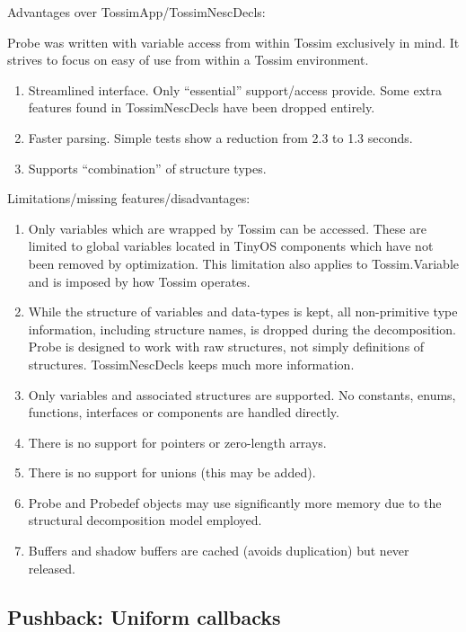 Advantages over TossimApp/TossimNescDecls:

Probe was written with variable access from within Tossim exclusively
in mind. It strives to focus on easy of use from within a Tossim
environment.
\begin{enumerate}
\item Streamlined interface. Only ``essential'' support/access
  provide. Some extra features found in TossimNescDecls have been
  dropped entirely.
\item Faster parsing. Simple tests show a reduction from 2.3 to 1.3
  seconds.
\item Supports ``combination'' of structure types.
\end{enumerate}

Limitations/missing features/disadvantages:

\begin{enumerate}
  \item Only variables which are wrapped by Tossim can be accessed.
    These are limited to global variables located in TinyOS components
    which have not been removed by optimization. This limitation also
    applies to Tossim.Variable and is imposed by how Tossim operates.
  \item While the structure of variables and data-types is kept, all
    non-primitive type information, including structure names, is
    dropped during the decomposition. Probe is designed to work with
    raw structures, not simply definitions of
    structures. TossimNescDecls keeps much more information.
  \item Only variables and associated structures are supported. No
    constants, enums, functions, interfaces or components are handled
    directly.
  \item There is no support for pointers or zero-length arrays.
  \item There is no support for unions (this may be added).
  \item Probe and Probedef objects may use significantly more memory
    due to the structural decomposition model employed.
  \item Buffers and shadow buffers are cached (avoids duplication) but
    never released.
\end{enumerate}


\subsection{Pushback: Uniform callbacks}

